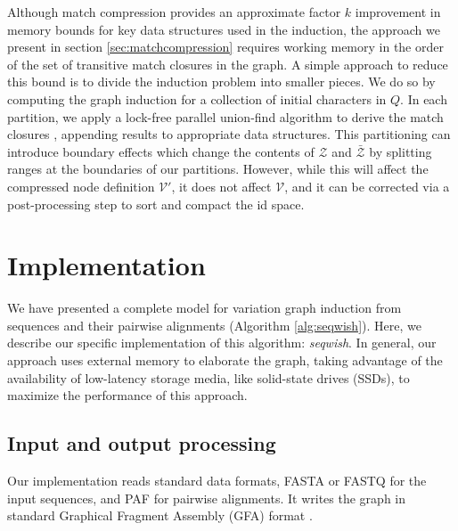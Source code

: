 \documentclass{bioinfo}
\theoremstyle{definition}
\begin{document}
Although match compression provides an approximate factor $k$ improvement in memory bounds for key data structures used in the induction, the approach we present in section \ref{sec:matchcompression} requires working memory in the order of the set of transitive match closures in the graph.
A simple approach to reduce this bound is to divide the induction problem into smaller pieces.
We do so by computing the graph induction for a collection of initial characters in $Q$.
In each partition, we apply a lock-free parallel union-find algorithm to derive the match closures \citep{anderson1991wait}, appending results to appropriate data structures.
This partitioning can introduce boundary effects which change the contents of $\mathcal{Z}$ and $\bar{\mathcal{Z}}$ by splitting ranges at the boundaries of our partitions.
However, while this will affect the compressed node definition $\mathcal{V}'$, it does not affect $\mathcal{V}$, and it can be corrected via a post-processing step to sort and compact the id space.


\section{Implementation}

We have presented a complete model for variation graph induction from sequences and their pairwise alignments (Algorithm \ref{alg:seqwish}).
Here, we describe our specific implementation of this algorithm: \textit{seqwish}.
In general, our approach uses external memory to elaborate the graph, taking advantage of the availability of low-latency storage media, like solid-state drives (SSDs), to maximize the performance of this approach.

\subsection{Input and output processing}

Our implementation reads standard data formats, FASTA or FASTQ for the input sequences, and PAF \citep{Li_2018} for pairwise alignments.
It writes the graph in standard Graphical Fragment Assembly (GFA) format \citep{GFA}.
\end{document}
